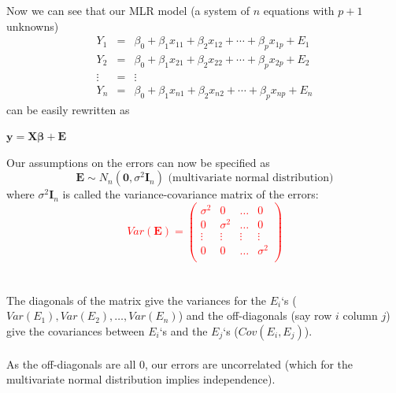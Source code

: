 Now we can see that our MLR model (a system of $n$ equations with $p+1$ unknowns) 
\begin{eqnarray*}
Y_1 & = & \beta_0 + \beta_1 x_{11} + \beta_2 x_{12}+ \cdots + \beta_p x_{1p} + E_1 \\
Y_2 & = & \beta_0 + \beta_1 x_{21} + \beta_2 x_{22}+ \cdots + \beta_p x_{2p} + E_2 \\
\vdots & = & \vdots \\
Y_n & = & \beta_0 + \beta_1 x_{n1} + \beta_2 x_{n2}+ \cdots + \beta_p x_{np} + E_n
\end{eqnarray*}
can be easily rewritten as
\begin{center}
$\textbf{y} = \textbf{X}\boldsymbol{\beta} + \textbf{E}$
\end{center}

\newpage

Our assumptions on the errors can now be specified as 
$$\textbf{E}\sim N_n(\boldsymbol{0},\sigma^2 \textbf{I}_{n}) \mbox{   (multivariate normal distribution)}$$
where $\sigma^2 \textbf{I}_{n}$ is called the variance-covariance matrix of the errors:\\%
\textcolor{red}{$$
Var(\textbf{E})=\left(\begin{array}{cccc}
\sigma^2  &  0  &   \ldots & 0 \\
0  &  \sigma^2  &   \ldots & 0 \\
\vdots &\vdots &\vdots &\vdots  \\ 
0  &  0  &  \ldots & \sigma^2 \\
\end{array}\right)$$}~\\~\\


The diagonals of the matrix give the variances for the $E_i$`s ($Var(E_1), Var(E_2), \ldots, Var(E_n)$) and the off-diagonals (say row $i$ column $j$) give the covariances between $E_i$`s and the $E_j$`s ($Cov(E_i, E_j)$).  \\~\\
As the off-diagonals are all 0, our errors are uncorrelated (which for the multivariate normal distribution implies independence).\\~\\

